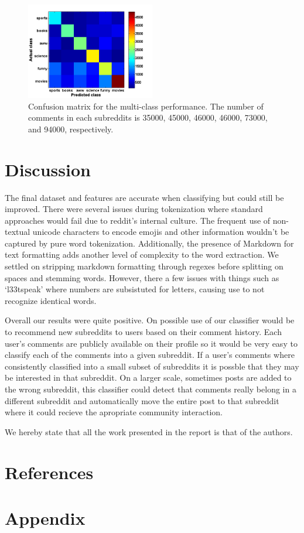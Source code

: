 \documentclass[10pt,twocolumn]{article}
\begin{document}
\begin{figure}
    \centering
  	\includegraphics[width=0.5\textwidth]{./confusion_mat.png}
  	\caption{Confusion matrix for the multi-class performance. The number of comments in each subreddits is 35000, 45000, 46000, 46000, 73000, and 94000, respectively.}
  	\label{confusion}
\end{figure}	
\section{Discussion}
The final dataset and features are accurate when classifying but could still be improved. There were several issues during tokenization where standard approaches would fail due to reddit's internal culture. The frequent use of non-textual unicode characters to encode emojis and other information wouldn't be captured by pure word tokenization. Additionally, the presence of Markdown for text formatting adds another level of complexity to the word extraction. We settled on stripping markdown formatting through regexes before splitting on spaces and stemming words. However, there a few issues with things such as `l33tspeak' where numbers are subsistuted for letters, causing use to not recognize identical words. 

Overall our results were quite positive. On possible use of our classifier would be to recommend new subreddits to users based on their comment history. Each user's comments are publicly available on their profile so it would be very easy to classify each of the comments into a given subreddit. If a user's comments where consistently classified into a small subset of subreddits it is possble that they may be interested in that subreddit. On a larger scale, sometimes posts are added to the wrong subreddit, this classifier could detect that comments really belong in a different subreddit and automatically move the entire post to that subreddit where it could recieve the apropriate community interaction.

We hereby state that all the work presented in the report is that of the authors.

\section{References}
\printbibliography
\section{Appendix}
\end{document}
